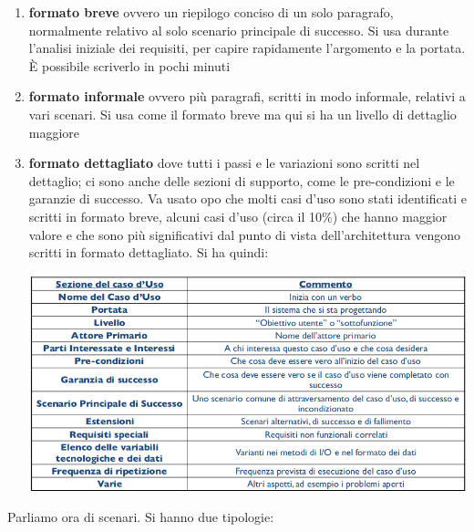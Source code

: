 \documentclass[a4paper,12pt, oneside]{book}
\begin{document}
\begin{enumerate}
	\item \textbf{formato breve} ovvero un riepilogo conciso di un solo paragrafo, normalmente relativo al
	solo scenario principale di successo. Si usa durante l'analisi iniziale dei requisiti, per capire rapidamente l'argomento e la portata. È possibile scriverlo in pochi minuti
	\item \textbf{formato informale} ovvero più paragrafi, scritti in modo informale, relativi a vari scenari. Si usa come il formato breve ma qui si ha un livello di dettaglio maggiore
	\item \textbf{formato dettagliato} dove tutti i passi e le variazioni sono scritti nel dettaglio; ci sono anche delle sezioni di supporto, come le pre-condizioni e le garanzie di successo. Va usato opo che molti casi d'uso sono stati identificati e scritti in formato breve, alcuni casi d'uso (circa il 10\%) che hanno maggior valore e che sono più significativi dal punto di vista dell'architettura vengono scritti in formato dettagliato. Si ha quindi:
	\begin{center}
		\includegraphics[scale=0.5]{img/det.png}
	\end{center}
\end{enumerate}
Parliamo ora di scenari. Si hanno due tipologie:
\end{document}
